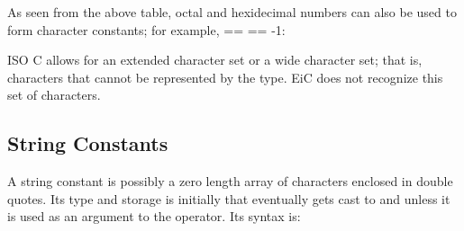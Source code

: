 As seen from the above table, octal and hexidecimal numbers can also be used
to form character constants; for example,  ==
 == -1:



\begin{warning}
ISO C allows for an extended character set or a wide character
 set; that is, characters that cannot be represented by
the  type. EiC does
not recognize this set of characters. 
\end{warning}

\subsection{String Constants}
\label{sec:StringConstants}

A string constant is possibly a zero length array of characters
enclosed in double quotes.  Its type and storage is initially
 that eventually gets cast to
 and unless it is used as an argument to the  operator. 
Its syntax is:

\begin{production}
\end{production}

